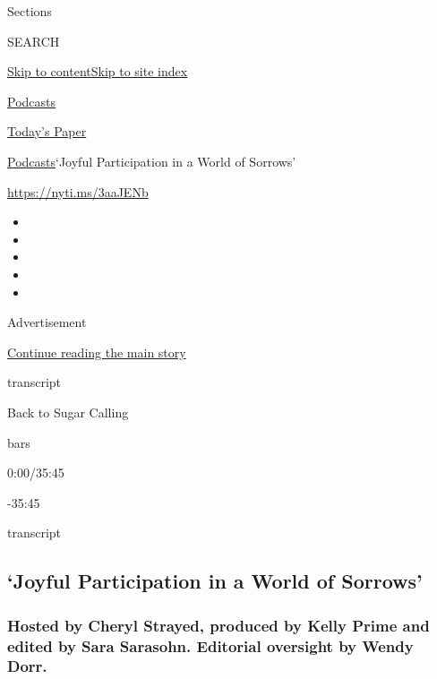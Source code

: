 Sections

SEARCH

\protect\hyperlink{site-content}{Skip to
content}\protect\hyperlink{site-index}{Skip to site index}

\href{https://www.nytimes3xbfgragh.onion/spotlight/podcasts}{Podcasts}

\href{https://myaccount.nytimes3xbfgragh.onion/auth/login?response_type=cookie\&client_id=vi}{}

\href{https://www.nytimes3xbfgragh.onion/section/todayspaper}{Today's
Paper}

\href{/spotlight/podcasts}{Podcasts}\textbar{}`Joyful Participation in a
World of Sorrows'

\href{https://nyti.ms/3aaJENb}{https://nyti.ms/3aaJENb}

\begin{itemize}
\item
\item
\item
\item
\item
\end{itemize}

Advertisement

\protect\hyperlink{after-top}{Continue reading the main story}

transcript

Back to Sugar Calling

bars

0:00/35:45

-35:45

transcript

\hypertarget{joyful-participation-in-a-world-of-sorrows}{%
\subsection{`Joyful Participation in a World of
Sorrows'}\label{joyful-participation-in-a-world-of-sorrows}}

\hypertarget{hosted-by-cheryl-strayed-produced-by-kelly-prime-and-edited-by-sara-sarasohn-editorial-oversight-by-wendy-dorr}{%
\subsubsection{Hosted by Cheryl Strayed, produced by Kelly Prime and
edited by Sara Sarasohn. Editorial oversight by Wendy
Dorr.}\label{hosted-by-cheryl-strayed-produced-by-kelly-prime-and-edited-by-sara-sarasohn-editorial-oversight-by-wendy-dorr}}

